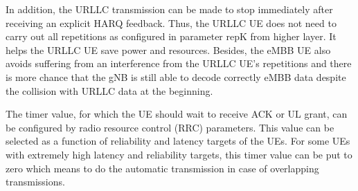 \documentclass[conference]{IEEEtran}
\begin{document}
In addition, the URLLC transmission can be made to stop immediately after receiving an explicit HARQ feedback. Thus, the URLLC UE does not need to carry out all repetitions as configured in parameter repK from higher layer. It helps the URLLC UE save power and resources. Besides, the eMBB UE also avoids suffering from an interference from the URLLC UE’s repetitions and there is more chance that the gNB is still able to decode correctly eMBB data despite the collision with URLLC data at the beginning. 

The timer value, for which the UE should wait to receive ACK or UL grant, can be configured by radio resource control (RRC) parameters. This value can be selected as a function of reliability and latency targets of the UEs. For some UEs with extremely high latency and reliability targets, this timer value can be put to zero which means to do the automatic transmission in case of overlapping transmissions.

\end{document}
